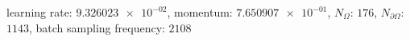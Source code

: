 learning rate: $\num[scientific-notation=true]{9.326023e-02}$, momentum: $\num[scientific-notation=true]{7.650907e-01}$, $N_{\Omega}$: $\num[scientific-notation=false]{176}$, $N_{\partial\Omega}$: $\num[scientific-notation=false]{1143}$, batch sampling frequency: $\num[scientific-notation=false]{2108}$